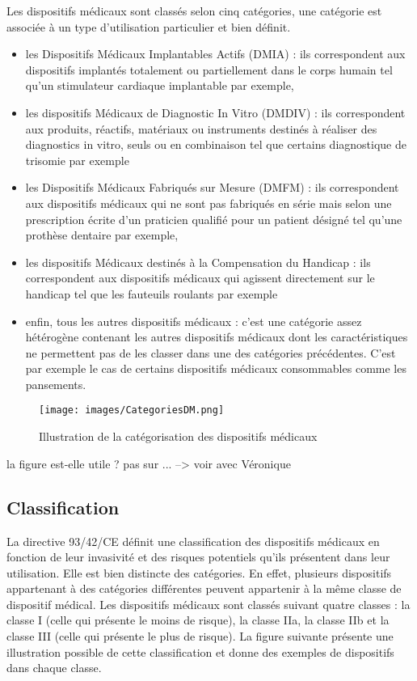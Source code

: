 Les dispositifs médicaux sont classés selon cinq catégories, une catégorie est associée à un type d'utilisation particulier et bien définit.
\begin{itemize}
\item les Dispositifs Médicaux Implantables Actifs (DMIA) : ils correspondent aux dispositifs implantés totalement ou partiellement dans le corps humain tel qu'un stimulateur cardiaque implantable par exemple,
\item les dispositifs Médicaux de Diagnostic In Vitro (DMDIV) : ils correspondent aux produits, réactifs, matériaux ou instruments destinés à réaliser des diagnostics in vitro, seuls ou en combinaison tel que certains diagnostique de trisomie par exemple
\item les Dispositifs Médicaux Fabriqués sur Mesure (DMFM) : ils correspondent aux dispositifs médicaux qui ne sont pas fabriqués en série mais selon une prescription écrite d'un praticien qualifié pour un patient désigné tel qu'une prothèse dentaire par exemple,
\item les dispositifs Médicaux destinés à la Compensation du Handicap : ils correspondent aux dispositifs médicaux qui agissent directement sur le handicap tel que les fauteuils roulants par exemple
\item enfin, tous les autres dispositifs médicaux : c'est une catégorie assez hétérogène contenant les autres dispositifs médicaux dont les caractéristiques ne permettent pas de les classer dans une des catégories précédentes. C'est par exemple le cas de certains dispositifs médicaux consommables comme les pansements.
\end{itemize}

\begin{figure}[htbp]%
\begin{center}
\texttt{[image: images/CategoriesDM.png]} 
\end{center}
\caption{Illustration de la catégorisation des dispositifs médicaux}
\end{figure}

la figure est-elle utile ? pas sur ... --> voir avec Véronique


\subsection{Classification}

La directive 93/42/CE définit une classification des dispositifs médicaux en fonction de leur invasivité et des risques potentiels qu'ils présentent dans leur utilisation. Elle est bien distincte des catégories. En effet, plusieurs dispositifs appartenant à des catégories différentes peuvent appartenir à la même classe de dispositif médical.
Les dispositifs médicaux sont classés suivant quatre classes : la classe I (celle qui présente le moins de risque), la classe IIa, la classe IIb et la classe III (celle qui présente le plus de risque).
La figure suivante présente une illustration possible de cette classification et donne des exemples de dispositifs dans chaque classe. 

